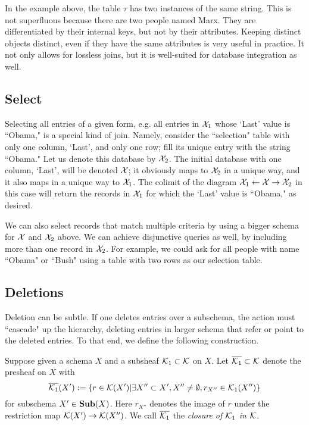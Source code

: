 \documentclass{amsart}
\def\Sub{{\bf Sub}}
\begin{document}
In the example above, the table $\tau$ has two instances of the same string.  This is not superfluous because there are two people named Marx.  They are differentiated by their internal keys, but not by their attributes.  Keeping distinct objects distinct, even if they have the same attributes is very useful in practice.  It not only allows for lossless joins, but it is well-suited for database integration as well.

\subsection{Select}\label{subsec:select}

Selecting all entries of a given form, e.g. all entries in $\mathcal{X}_1$ whose `Last' value is ``Obama," is a special kind of join.  Namely, consider the ``selection" table with only one column, `Last', and only one row; fill its unique entry with the string ``Obama."  Let us denote this database by $\mathcal{X}_2$.  The initial database with one column, `Last', will be denoted $\mathcal{X}$; it obviously maps to $\mathcal{X}_2$ in a unique way, and it also maps in a unique way to $\mathcal{X}_1$.  The colimit of the diagram $\mathcal{X}_1\leftarrow\mathcal{X}\rightarrow\mathcal{X}_2$ in this case will return the records in $\mathcal{X}_1$ for which the `Last' value is ``Obama," as desired.

We can also select records that match multiple criteria by using a bigger schema for $\mathcal{X}$ and $\mathcal{X}_2$ above.  We can achieve disjunctive queries as well, by including more than one record in $\mathcal{X}_2$.  For example, we could ask for all people with name ``Obama" or ``Bush" using a table with two rows as our selection table. 

\subsection{Deletions}\label{subsec:delete}

Deletion can be subtle.  If one deletes entries over a subschema, the action must ``cascade" up the hierarchy, deleting entries in larger schema that refer or point to the deleted entries.  To that end, we define the following construction.  

\begin{definition}

Suppose given a schema $X$ and a subsheaf $\mathcal{K}_1\subset\mathcal{K}$ on $X$.  Let $\overline{\mathcal{K}_1}\subset\mathcal{K}$ denote the presheaf on $X$ with $$\overline{\mathcal{K}_1}(X'):=\{r\in\mathcal{K}(X')|\exists X''\subset X', X''\neq\emptyset, r_{X''}\in\mathcal{K}_1(X'')\}$$ for subschema $X'\in\Sub(X)$.  Here $r_{X''}$ denotes the image of $r$ under the restriction map $\mathcal{K}(X')\rightarrow\mathcal{K}(X'')$.  We call $\overline{\mathcal{K}_1}$ the {\em closure of $\mathcal{K}_1$ in $\mathcal{K}$}.

\end{definition}
\end{document}
